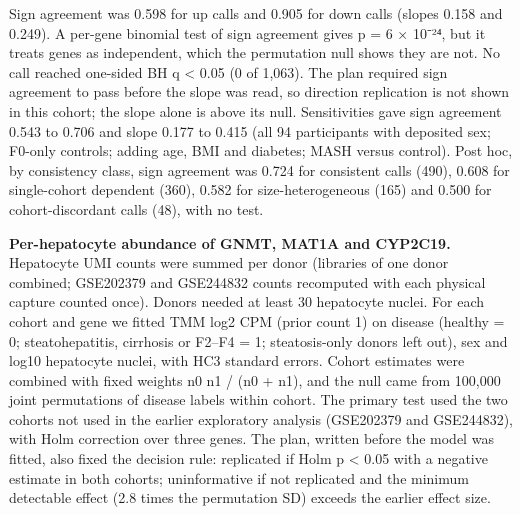 Sign agreement was 0.598 for up calls and 0.905 for down calls (slopes 0.158 and 0.249). A per-gene binomial test of sign agreement gives p = 6 × 10⁻²⁴, but it treats genes as independent, which the permutation null shows they are not. No call reached one-sided BH q \textless{} 0.05 (0 of 1,063). The plan required sign agreement to pass before the slope was read, so direction replication is not shown in this cohort; the slope alone is above its null. Sensitivities gave sign agreement 0.543 to 0.706 and slope 0.177 to 0.415 (all 94 participants with deposited sex; F0-only controls; adding age, BMI and diabetes; MASH versus control). Post hoc, by consistency class, sign agreement was 0.724 for consistent calls (490), 0.608 for single-cohort dependent (360), 0.582 for size-heterogeneous (165) and 0.500 for cohort-discordant calls (48), with no test.

\textbf{Per-hepatocyte abundance of GNMT, MAT1A and CYP2C19.} Hepatocyte UMI counts were summed per donor (libraries of one donor combined; GSE202379 and GSE244832 counts recomputed with each physical capture counted once). Donors needed at least 30 hepatocyte nuclei. For each cohort and gene we fitted TMM log2 CPM (prior count 1) on disease (healthy = 0; steatohepatitis, cirrhosis or F2--F4 = 1; steatosis-only donors left out), sex and log10 hepatocyte nuclei, with HC3 standard errors. Cohort estimates were combined with fixed weights n0 n1 / (n0 + n1), and the null came from 100,000 joint permutations of disease labels within cohort. The primary test used the two cohorts not used in the earlier exploratory analysis (GSE202379 and GSE244832), with Holm correction over three genes. The plan, written before the model was fitted, also fixed the decision rule: replicated if Holm p \textless{} 0.05 with a negative estimate in both cohorts; uninformative if not replicated and the minimum detectable effect (2.8 times the permutation SD) exceeds the earlier effect size.

